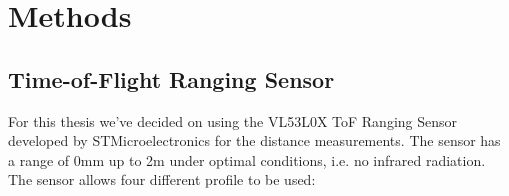 \chapter{Methods}
\label{sec:evaluation}

\section{Time-of-Flight Ranging Sensor}
For this thesis we've decided on using the VL53L0X ToF Ranging Sensor developed by STMicroelectronics for the distance measurements. The sensor has a range of 0\unit{mm} up to 2\unit{m} under optimal conditions, i.e. no infrared radiation. The sensor allows four different profile to be used:\\